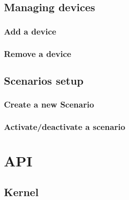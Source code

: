 \documentclass[letterpaper,10pt,english]{sphinxmanual}
\begin{document}
\section{Managing devices}
\label{first_steps:managing-devices}

\subsection{Add a device}
\label{first_steps:add-a-device}

\subsection{Remove a device}
\label{first_steps:remove-a-device}

\section{Scenarios setup}
\label{first_steps:scenarios-setup}

\subsection{Create a new Scenario}
\label{first_steps:create-a-new-scenario}

\subsection{Activate/deactivate a scenario}
\label{first_steps:activate-deactivate-a-scenario}

\chapter{API}
\label{api:api}\label{api::doc}

\section{Kernel}
\label{api/kernel:kernel}\label{api/kernel::doc}
\end{document}
